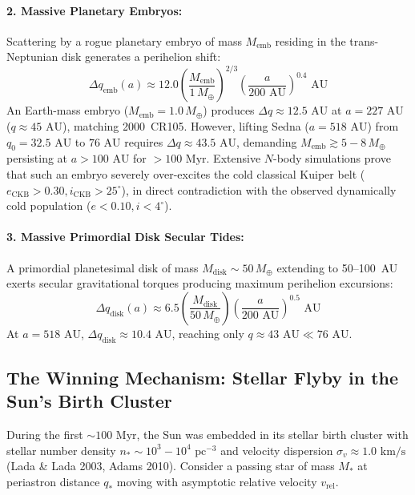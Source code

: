 \documentclass[11pt,a4paper]{article}
\begin{document}
\paragraph{2. Massive Planetary Embryos:} Scattering by a rogue planetary embryo of mass $M_{\text{emb}}$ residing in the trans-Neptunian disk generates a perihelion shift:
\begin{equation}
\Delta q_{\text{emb}}(a) \approx 12.0 \left(\frac{M_{\text{emb}}}{1\,M_\oplus}\right)^{2/3} \left(\frac{a}{200\text{ AU}}\right)^{0.4}\text{ AU}
\end{equation}
An Earth-mass embryo ($M_{\text{emb}} = 1.0\,M_\oplus$) produces $\Delta q \approx 12.5\text{ AU}$ at $a = 227\text{ AU}$ ($q \approx 45\text{ AU}$), matching 2000~CR105. However, lifting Sedna ($a = 518\text{ AU}$) from $q_0 = 32.5\text{ AU}$ to $76\text{ AU}$ requires $\Delta q \approx 43.5\text{ AU}$, demanding $M_{\text{emb}} \gtrsim 5-8\,M_\oplus$ persisting at $a > 100\text{ AU}$ for $>100\text{ Myr}$. Extensive $N$-body simulations prove that such an embryo severely over-excites the cold classical Kuiper belt ($e_{\text{CKB}} > 0.30, i_{\text{CKB}} > 25^\circ$), in direct contradiction with the observed dynamically cold population ($e < 0.10, i < 4^\circ$).

\paragraph{3. Massive Primordial Disk Secular Tides:} A primordial planetesimal disk of mass $M_{\text{disk}} \sim 50\,M_\oplus$ extending to 50--100~AU exerts secular gravitational torques producing maximum perihelion excursions:
\begin{equation}
\Delta q_{\text{disk}}(a) \approx 6.5 \left(\frac{M_{\text{disk}}}{50\,M_\oplus}\right) \left(\frac{a}{200\text{ AU}}\right)^{0.5}\text{ AU}
\end{equation}
At $a = 518\text{ AU}$, $\Delta q_{\text{disk}} \approx 10.4\text{ AU}$, reaching only $q \approx 43\text{ AU} \ll 76\text{ AU}$.

\subsection{The Winning Mechanism: Stellar Flyby in the Sun's Birth Cluster}
During the first $\sim 100\text{ Myr}$, the Sun was embedded in its stellar birth cluster with stellar number density $n_* \sim 10^3-10^4\text{ pc}^{-3}$ and velocity dispersion $\sigma_v \approx 1.0\text{ km/s}$ (Lada \& Lada 2003, Adams 2010). Consider a passing star of mass $M_*$ at periastron distance $q_*$ moving with asymptotic relative velocity $v_{\text{rel}}$.
\end{document}
